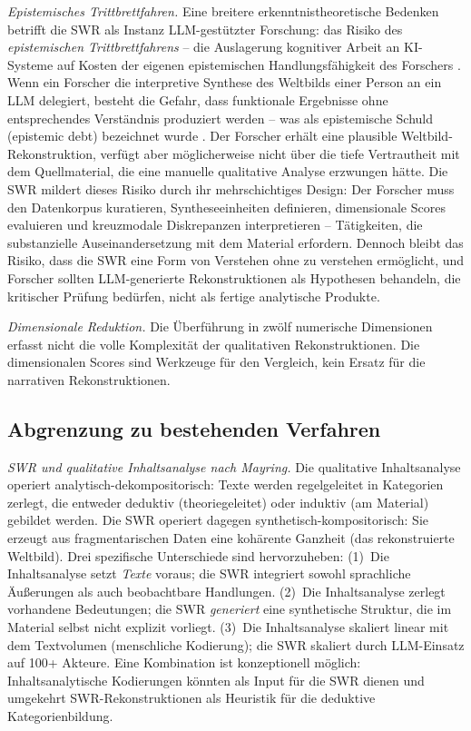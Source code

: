 \documentclass[11pt,a4paper]{article}
\theoremstyle{definition}
\theoremstyle{plain}
\theoremstyle{remark}
\begin{document}
\emph{Epistemisches Trittbrettfahren.} Eine breitere erkenntnistheoretische Bedenken betrifft die SWR als Instanz LLM-gest\"utzter Forschung: das Risiko des \emph{epistemischen Trittbrettfahrens} -- die Auslagerung kognitiver Arbeit an KI-Systeme auf Kosten der eigenen epistemischen Handlungsf\"ahigkeit des Forschers \citep{Danaher2018, Messeri2024}. Wenn ein Forscher die interpretive Synthese des Weltbilds einer Person an ein LLM delegiert, besteht die Gefahr, dass funktionale Ergebnisse ohne entsprechendes Verst\"andnis produziert werden -- was als \glqq epistemische Schuld\grqq{} (epistemic debt) bezeichnet wurde \citep{Sankaranarayanan2026}. Der Forscher erh\"alt eine plausible Weltbild-Rekonstruktion, verf\"ugt aber m\"oglicherweise nicht \"uber die tiefe Vertrautheit mit dem Quellmaterial, die eine manuelle qualitative Analyse erzwungen h\"atte. Die SWR mildert dieses Risiko durch ihr mehrschichtiges Design: Der Forscher muss den Datenkorpus kuratieren, Syntheseeinheiten definieren, dimensionale Scores evaluieren und kreuzmodale Diskrepanzen interpretieren -- T\"atigkeiten, die substanzielle Auseinandersetzung mit dem Material erfordern. Dennoch bleibt das Risiko, dass die SWR eine Form von \glqq Verstehen ohne zu verstehen\grqq{} erm\"oglicht, und Forscher sollten LLM-generierte Rekonstruktionen als Hypothesen behandeln, die kritischer Pr\"ufung bed\"urfen, nicht als fertige analytische Produkte.

\emph{Dimensionale Reduktion.} Die \"Uberf\"uhrung in zw\"olf numerische Dimensionen erfasst nicht die volle Komplexit\"at der qualitativen Rekonstruktionen. Die dimensionalen Scores sind Werkzeuge f\"ur den Vergleich, kein Ersatz f\"ur die narrativen Rekonstruktionen.


\subsection{Abgrenzung zu bestehenden Verfahren}
\label{sec:abgrenzung}

\emph{SWR und qualitative Inhaltsanalyse nach Mayring.} Die qualitative Inhaltsanalyse \citep{Mayring2022} operiert analytisch-dekompositorisch: Texte werden regelgeleitet in Kategorien zerlegt, die entweder deduktiv (theoriegeleitet) oder induktiv (am Material) gebildet werden. Die SWR operiert dagegen synthetisch-kompositorisch: Sie erzeugt aus fragmentarischen Daten eine koh\"arente Ganzheit (das rekonstruierte Weltbild). Drei spezifische Unterschiede sind hervorzuheben: (1)~Die Inhaltsanalyse setzt \emph{Texte} voraus; die SWR integriert sowohl sprachliche \"Au\ss{}erungen als auch beobachtbare Handlungen. (2)~Die Inhaltsanalyse zerlegt vorhandene Bedeutungen; die SWR \emph{generiert} eine synthetische Struktur, die im Material selbst nicht explizit vorliegt. (3)~Die Inhaltsanalyse skaliert linear mit dem Textvolumen (menschliche Kodierung); die SWR skaliert durch LLM-Einsatz auf 100+ Akteure. Eine Kombination ist konzeptionell m\"oglich: Inhaltsanalytische Kodierungen k\"onnten als Input f\"ur die SWR dienen und umgekehrt SWR-Rekonstruktionen als Heuristik f\"ur die deduktive Kategorienbildung.
\end{document}
